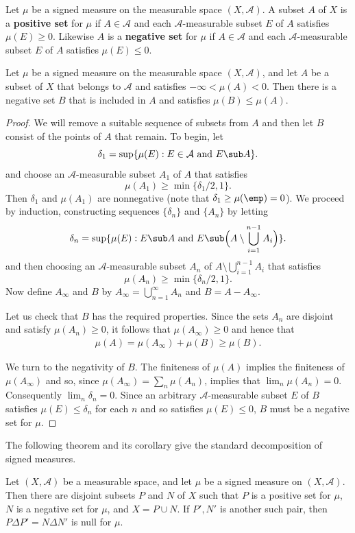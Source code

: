 Let $\mu$ be a signed measure on the measurable space $(X,\mathcal{A})$. A subset $A$ of $X$ is a \textbf{positive set} for $\mu$ if $A\in\mathcal{A}$ and each $\mathcal{A}$-measurable subset $E$ of $A$ satisfies $\mu(E)\geq 0$. Likewise $A$ is a \textbf{negative set} for $\mu$ if $A\in\mathcal{A}$ and each $\mathcal{A}$-measurable subset $E$ of $A$ satisfies $\mu(E)\leq 0$.
\begin{lemma}\label{negative subset lem}
Let $\mu$ be a signed measure on the measurable space $(X,\mathcal{A})$, and let $A$ be a subset of $X$ that belongs to $\mathcal{A}$ and satisfies $-\infty<\mu(A)<0$. Then there is a negative set $B$ that is included in $A$ and satisfies $\mu(B)\leq\mu(A)$.
\end{lemma}
\begin{proof}
We will remove a suitable sequence of subsets from $A$ and then let $B$ consist
of the points of $A$ that remain. To begin, let
\[\delta_1=\sup\{\mu(E):E\in\mathcal{A}\text{ and }E\sub A\}.\]
and choose an $\mathcal{A}$-measurable subset $A_1$ of $A$ that satisfies
\[\mu(A_1)\geq\min\{\delta_1/2,1\}.\]
Then $\delta_1$ and $\mu(A_1)$ are nonnegative (note that $\delta_1\geq \mu(\emp)=0$). We proceed by induction, constructing sequences $\{\delta_n\}$ and $\{A_n\}$ by letting
\[\delta_n=\sup\{\mu(E):E\sub A\text{ and }E\sub\Big(A\setminus\bigcup_{i=1}^{n-1}A_i\Big)\}.\]
and then choosing an $\mathcal{A}$-measurable subset $A_n$ of $A\setminus\bigcup_{i=1}^{n-1}A_i$ that satisfies
\[\mu(A_n)\geq\min\{\delta_n/2,1\}.\]
Now define $A_{\infty}$ and $B$ by $A_\infty=\bigcup_{n=1}^{\infty}A_n$ and $B=A-A_{\infty}$.\par
Let us check that $B$ has the required properties. Since the sets $A_n$ are disjoint and satisfy $\mu(A_n)\geq 0$, it follows that $\mu(A_\infty)\geq 0$ and hence that
\begin{align*}
\mu(A)=\mu(A_\infty)+\mu(B)\geq\mu(B).
\end{align*}

We turn to the negativity of $B$. The finiteness of $\mu(A)$ implies the finiteness of $\mu(A_\infty)$ and so, since $\mu(A_\infty)=\sum_n\mu(A_n)$, implies that $\lim_n\mu(A_n)=0$. Consequently $\lim_n\delta_n=0$. Since an arbitrary $\mathcal{A}$-measurable subset $E$ of $B$ satisfies $\mu(E)\leq\delta_n$ for each $n$ and so satisfies $\mu(E)\leq 0$, $B$ must be a negative set for $\mu$.
\end{proof}
The following theorem and its corollary give the standard decomposition of
signed measures.
\begin{theorem}
Let $(X,\mathcal{A})$ be a measurable space, and let $\mu$ be a signed measure on $(X,\mathcal{A})$. Then there are disjoint subsets $P$ and $N$ of $X$ such that $P$ is a positive set for $\mu$, $N$ is a negative set for $\mu$, and $X=P\cup N$. If $P',N'$ is another such pair, then $P\Delta P'=N\Delta N'$ is null for $\mu$.
\end{theorem}
